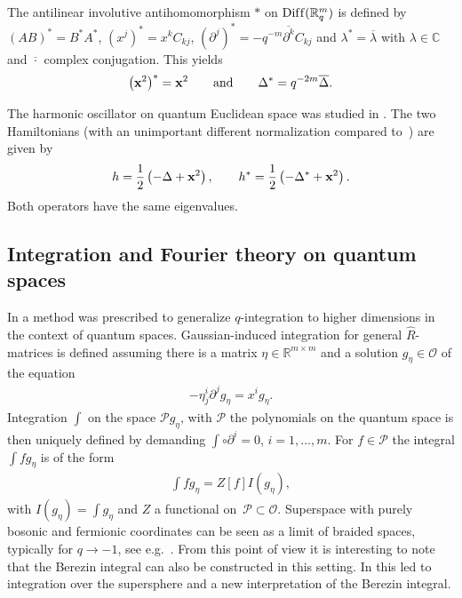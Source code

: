 \documentclass[pdftex]{sigma}
\newcommand{\mR}{\mathbb{R}}
\newcommand{\mC}{\mathbb{C}}
\newcommand{\cP}{\mathcal{P}}
\newcommand{\cO}{\mathcal{O}}
\numberwithin{equation}{section}
\begin{document}
The antilinear involutive antihomomorphism $\ast$ on ${\rm Dif\/f}(\mR^m_q)$ is def\/ined by $(AB)^\ast=B^\ast A^\ast$, $(x^j)^\ast=x^kC_{kj}$,  $(\partial^j)^\ast=-q^{-m}\overline{\partial^k}C_{kj}$ and $\lambda^\ast=\overline{\lambda}$ with $\lambda\in\mC$ and $\overline{\cdot}$ complex conjugation. This yields
\begin{gather*}
\big(\bold{x}^2\big)^\ast=\bold{x}^2 \qquad \mbox{and}\qquad \Delta^\ast=q^{-2m}\overline{\Delta}.
\end{gather*}

The harmonic oscillator on quantum Euclidean space was studied in \cite{MR1097174, MR1288667, MR1239953}. The two Hamiltonians (with an unimportant dif\/ferent normalization compared to~\cite{MR1239953}) are given by
\begin{gather}
\label{HOs}
h=\frac{1}{2}\left(-\Delta+\bold{x}^2\right),\qquad h^\ast=\frac{1}{2}\left(-{\Delta}^\ast+\bold{x}^2\right).
\end{gather}
Both operators have the same eigenvalues.


\subsection{Integration and Fourier theory on quantum spaces}
In \cite{MR1303081} a method was prescribed to generalize $q$-integration to higher dimensions in the context of quantum spaces. Gaussian-induced integration for general $\hat{R}$-matrices is def\/ined assuming there is a matrix $\eta\in\mR^{m\times m}$ and a solution $g_{\eta}\in\cO$ of the equation
\begin{gather}
\label{Gaussian}
-\eta^i_{ j}\partial^jg_{\eta}=x^i g_\eta.
\end{gather}
Integration $\int$ on the space $\cP g_{\eta}$, with $\cP$ the polynomials on the quantum space is then uniquely def\/ined by demanding $\int\circ \partial^i =0$, $i=1,\dots,m$. For $f\in\cP$ the integral $\int f g_{\eta}$ is of the form
\begin{gather}
\label{Gaussian2}
\int fg_{\eta}=Z[f]I(g_\eta),
\end{gather}
with $I(g_\eta)=\int g_\eta$ and $Z$ a functional on~$\cP\subset\cO$. Superspace with purely bosonic and fermionic coordinates can be seen as a limit of braided spaces, typically for $q\to-1$, see e.g.~\cite{MR1413908}. From this point of view it is interesting to note that the Berezin integral can also be constructed in this setting. In \cite{DBS5, MR2539324} this led to integration over the supersphere and a new interpretation of the Berezin integral.
\end{document}
